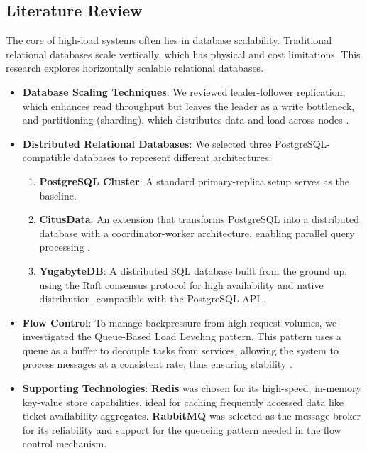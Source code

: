 \subsection{Literature Review}
The core of high-load systems often lies in database scalability. Traditional relational databases scale vertically, which has physical and cost limitations. This research explores horizontally scalable relational databases.
\begin{itemize}
    \item \textbf{Database Scaling Techniques}: We reviewed leader-follower replication, which enhances read throughput but leaves the leader as a write bottleneck, and partitioning (sharding), which distributes data and load across nodes \cite{dataIntensiveApplications}.
    \item \textbf{Distributed Relational Databases}: We selected three PostgreSQL-compatible databases to represent different architectures:
          \begin{enumerate}
              \item \textbf{PostgreSQL Cluster}: A standard primary-replica setup serves as the baseline.
              \item \textbf{CitusData}: An extension that transforms PostgreSQL into a distributed database with a coordinator-worker architecture, enabling parallel query processing \cite{citus}.
              \item \textbf{YugabyteDB}: A distributed SQL database built from the ground up, using the Raft consensus protocol for high availability and native distribution, compatible with the PostgreSQL API \cite{yugabyte}.
          \end{enumerate}
    \item \textbf{Flow Control}: To manage backpressure from high request volumes, we investigated the Queue-Based Load Leveling pattern. This pattern uses a queue as a buffer to decouple tasks from services, allowing the system to process messages at a consistent rate, thus ensuring stability \cite{queueLoadLeveling}.
    \item \textbf{Supporting Technologies}: \textbf{Redis} was chosen for its high-speed, in-memory key-value store capabilities, ideal for caching frequently accessed data like ticket availability aggregates. \textbf{RabbitMQ} was selected as the message broker for its reliability and support for the queueing pattern needed in the flow control mechanism.
\end{itemize}

